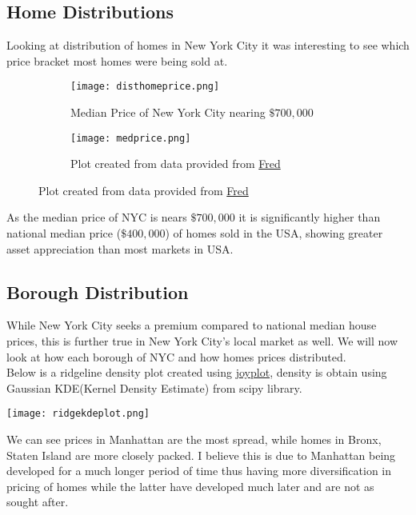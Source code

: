 \documentclass{article}
\begin{document}
\begin{titlepage}
\subsection{Home Distributions}
Looking at distribution of homes in New York City it was interesting to see which price bracket most homes were being sold at.

\begin{figure}[ht]

\begin{subfigure}{.5\textwidth}
\texttt{[image: disthomeprice.png]} 
\caption{Median Price of New York City nearing $\$700,000$ }
\label{fig:subim1}
\end{subfigure}
\begin{subfigure}{.5\textwidth}
\texttt{[image: medprice.png]}
\caption{Plot created from data provided from \href{https://fred.stlouisfed.org/series/MSPUS}{Fred}}
\label{fig:subim2}
\end{subfigure}
\newline
\label{fig:image2}
\end{figure}
As the median price of NYC is nears $\$700,000$ it is significantly higher than national median price ($\$400,000$) of homes sold in the USA, showing greater asset appreciation than most markets in USA.
\clearpage





\subsection{Borough Distribution}
While New York City seeks a premium compared to national median house prices, this is further true in New York City's local market as well. We will now look at how each borough of NYC and how homes prices distributed. 
\newline
\\

Below is a ridgeline density plot created using \href{https://github.com/leotac/joypy}{joyplot}, density is obtain using Gaussian KDE(Kernel Density Estimate) from scipy library.

\begin{center}
        \texttt{[image: ridgekdeplot.png]}
\end{center}

We can see prices in Manhattan are the most spread, while homes in Bronx, Staten Island are more closely packed. I believe this is due to Manhattan being developed for a much longer period of time thus having more diversification in pricing of homes while the latter have developed much later and are not as sought after. \\
\clearpage


\end{titlepage}
\end{document}
